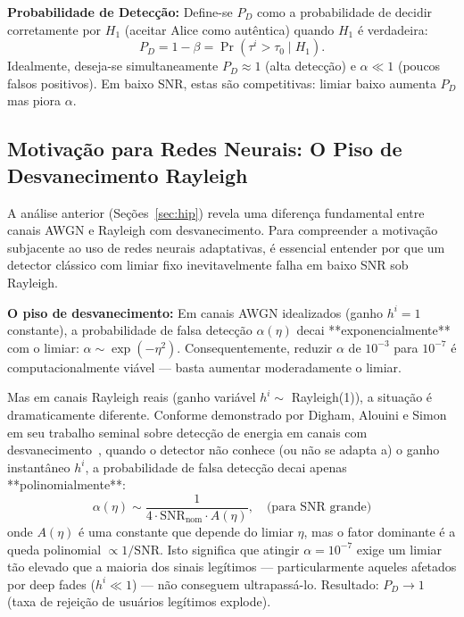 \documentclass[12pt,a4paper]{article}
\begin{document}
\textbf{Probabilidade de Detecção:} Define-se $P_D$ como a probabilidade de decidir corretamente por $H_1$ (aceitar Alice como autêntica) quando $H_1$ é verdadeira:
\begin{equation}\label{eq:pd}
P_D = 1 - \beta = \Pr(\tau^i > \tau_0 \mid H_1).
\end{equation}
Idealmente, deseja-se simultaneamente $P_D \approx 1$ (alta detecção) e $\alpha \ll 1$ (poucos falsos positivos). Em baixo SNR, estas são competitivas: limiar baixo aumenta $P_D$ mas piora $\alpha$.

\subsection{Motivação para Redes Neurais: O Piso de Desvanecimento Rayleigh}\label{sec:fading_floor}

A análise anterior (Seções~\ref{sec:hip}) revela uma diferença fundamental entre canais AWGN e Rayleigh com desvanecimento. Para compreender a motivação subjacente ao uso de redes neurais adaptativas, é essencial entender por que um detector clássico com limiar fixo inevitavelmente falha em baixo SNR sob Rayleigh.

\textbf{O piso de desvanecimento:} Em canais AWGN idealizados (ganho $h^i = 1$ constante), a probabilidade de falsa detecção $\alpha(\eta)$ decai **exponencialmente** com o limiar: $\alpha \sim \exp(-\eta^2)$. Consequentemente, reduzir $\alpha$ de $10^{-3}$ para $10^{-7}$ é computacionalmente viável — basta aumentar moderadamente o limiar.

Mas em canais Rayleigh reais (ganho variável $h^i \sim$ Rayleigh(1)), a situação é dramaticamente diferente. Conforme demonstrado por Digham, Alouini e Simon em seu trabalho seminal sobre detecção de energia em canais com desvanecimento~\cite{ref_digham}, quando o detector não conhece (ou não se adapta a) o ganho instantâneo $h^i$, a probabilidade de falsa detecção decai apenas **polinomialmente**:
\begin{equation}\label{eq:digham_floor}
    \alpha(\eta) \sim \frac{1}{4 \cdot \text{SNR}_{\text{nom}} \cdot A(\eta)}, \quad \text{(para SNR grande)}
\end{equation}
onde $A(\eta)$ é uma constante que depende do limiar $\eta$, mas o fator dominante é a queda polinomial $\propto 1/\text{SNR}$. Isto significa que atingir $\alpha = 10^{-7}$ exige um limiar tão elevado que a maioria dos sinais legítimos — particularmente aqueles afetados por deep fades ($h^i \ll 1$) — não conseguem ultrapassá-lo. Resultado: $P_D \to 1$ (taxa de rejeição de usuários legítimos explode).
\end{document}
